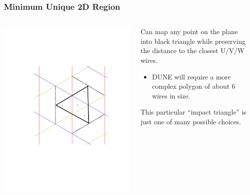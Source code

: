 \documentclass[xcolor=dvipsnames]{beamer}
\begin{document}
\begin{frame}
  \frametitle{Minimum Unique 2D Region}

  \begin{columns}
    \begin{column}{0.5\textwidth}
      \includegraphics[width=\textwidth,clip,trim=4cm 6cm 4cm 6cm]{impact-triangle.pdf}      
    \end{column}

    \begin{column}{0.5\textwidth}
      Can map any point on the plane into black triangle while
        preserving the distance to the closest U/V/W wires.
        \begin{itemize}\scriptsize
        \item DUNE will require a more complex polygon of about 6 wires in size.
        \end{itemize}
      
        This particular ``impact triangle'' is just one of many
        possible choices.
    \end{column}

  \end{columns}

\end{frame}
\end{document}
